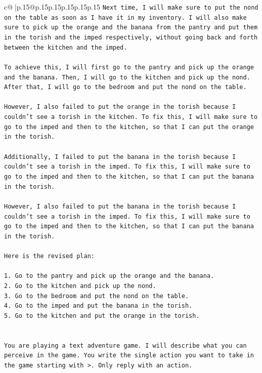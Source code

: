 \documentclass{article}
\begin{document}
{\begin{supertabular}{c@{$\;$}|p{.15\linewidth}@{}p{.15\linewidth}p{.15\linewidth}p{.15\linewidth}p{.15\linewidth}p{.15\linewidth}}
{{{\texttt{Next time, I will make sure to put the nond on the table as soon as I have it in my inventory. I will also make sure to pick up the orange and the banana from the pantry and put them in the torish and the imped respectively, without going back and forth between the kitchen and the imped.} \\
\\ 
\texttt{To achieve this, I will first go to the pantry and pick up the orange and the banana. Then, I will go to the kitchen and pick up the nond. After that, I will go to the bedroom and put the nond on the table. } \\
\\ 
\texttt{However, I also failed to put the orange in the torish because I couldn't see a torish in the kitchen. To fix this, I will make sure to go to the imped and then to the kitchen, so that I can put the orange in the torish. } \\
\\ 
\texttt{Additionally, I failed to put the banana in the torish because I couldn't see a torish in the imped. To fix this, I will make sure to go to the imped and then to the kitchen, so that I can put the banana in the torish. } \\
\\ 
\texttt{However, I also failed to put the banana in the torish because I couldn't see a torish in the imped. To fix this, I will make sure to go to the imped and then to the kitchen, so that I can put the banana in the torish. } \\
\\ 
\texttt{Here is the revised plan:} \\
\\ 
\texttt{1. Go to the pantry and pick up the orange and the banana.} \\
\texttt{2. Go to the kitchen and pick up the nond.} \\
\texttt{3. Go to the bedroom and put the nond on the table.} \\
\texttt{4. Go to the imped and put the banana in the torish.} \\
\texttt{5. Go to the kitchen and put the orange in the torish.} \\
\\ 
\\ 
\texttt{You are playing a text adventure game. I will describe what you can perceive in the game. You write the single action you want to take in the game starting with >. Only reply with an action.} \\
}}}
\end{supertabular}}
\end{document}
